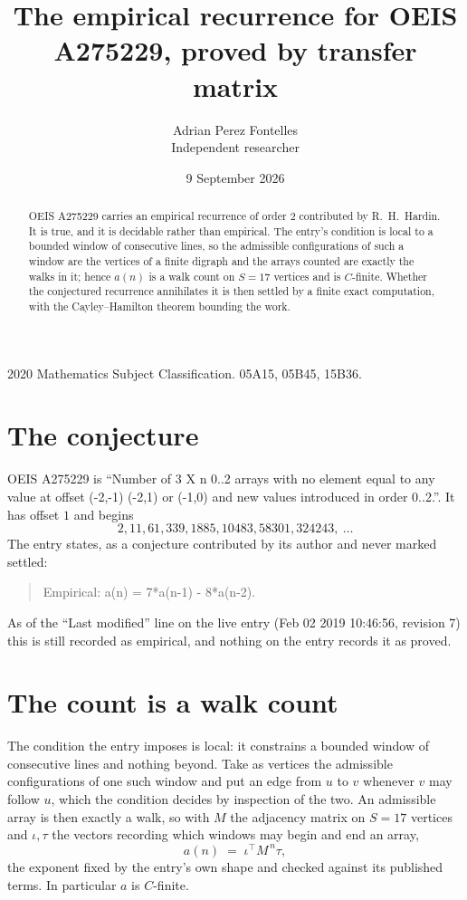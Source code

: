 \documentclass[11pt,a4paper]{article}
\title{The empirical recurrence for OEIS A275229, proved by transfer matrix}
\author{Adrian Perez Fontelles\\ \small Independent researcher}
\date{9 September 2026}
\theoremstyle{plain}
\theoremstyle{definition}
\begin{document}
\maketitle

\begin{abstract}
OEIS A275229 carries an empirical recurrence of order $2$ contributed by R.~H.~Hardin. It is
true, and it is decidable rather than empirical. The entry's condition is local to a bounded window of consecutive lines, so
the admissible configurations of such a window are the vertices of a finite digraph and the
arrays counted are exactly the walks in it; hence $a(n)$ is a walk count on $S=17$ vertices
and is $C$-finite. Whether the conjectured recurrence annihilates it is then settled by a
finite exact computation, with the Cayley--Hamilton theorem bounding the work.
\end{abstract}

\noindent\small 2020 Mathematics Subject Classification. 05A15, 05B45, 15B36.\normalsize

\section{The conjecture}

OEIS A275229 is ``Number of 3 X n 0..2 arrays with no element equal to any value at offset (-2,-1) (-2,1) or (-1,0) and new values introduced in order 0..2.''. It has offset $1$ and begins
\[
2, 11, 61, 339, 1885, 10483, 58301, 324243,\ \dots
\]
The entry states, as a conjecture contributed by its author and never marked settled:
\begin{quote}
Empirical: a(n) = 7*a(n-1) - 8*a(n-2).
\end{quote}
As of the ``Last modified'' line on the live entry (Feb 02 2019 10:46:56, revision 7) this is still
recorded as empirical, and nothing on the entry records it as proved.

\section{The count is a walk count}

The condition the entry imposes is local: it constrains a bounded window of consecutive lines and nothing beyond. Take as
vertices the admissible configurations of one such window and put an edge from $u$ to $v$
whenever $v$ may follow $u$, which the condition decides by inspection of the two. An
admissible array is then exactly a walk, so with $M$ the adjacency matrix on $S=17$ vertices
and $\iota,\tau$ the vectors recording which windows may begin and end an array,
\[
a(n)\;=\;\iota^{\!\top}M^{\,n}\tau ,
\]
the exponent fixed by the entry's own shape and checked against its published terms. In
particular $a$ is $C$-finite.
\end{document}

